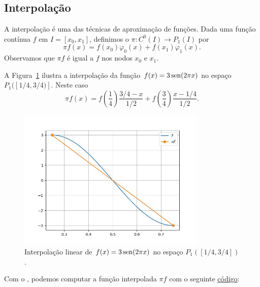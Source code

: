 \subsection{Interpolação}

A interpolação é uma das técnicas de aproximação de funções. Dada uma função contínua $f$ em $I=[x_0, x_1]$, definimos o  $\pi: C^0(I)\to P_1(I)$ por
\begin{equation}
  \pi f (x) = f(x_0)\varphi_0(x) + f(x_1)\varphi_1(x).
\end{equation}
Observamos que $\pi f$ é igual a $f$ nos nodos $x_0$ e $x_1$. 

\begin{ex}\label{ex:interp_lin}
  A Figura~\ref{fig:ex_interp_lin} ilustra a interpolação da função $f(x)=3\operatorname{sen}(2\pi x)$ no espaço $P_1([1/4, 3/4)]$. Neste caso
  \begin{equation}
    \pi f(x) = f\left(\frac{1}{4}\right)\frac{3/4-x}{1/2} + f\left(\frac{3}{4}\right)\frac{x-1/4}{1/2}.
  \end{equation}

  \begin{figure}[h!]
    \centering
    \includegraphics[width=0.8\textwidth]{./cap_mef1d/dados/ex_interp_lin/ex_interp_lin}
    \caption{Interpolação linear de $f(x)=3\operatorname{sen}(2\pi x)$ no espaço $P_1([1/4, 3/4])$.}
    \label{fig:ex_interp_lin}
  \end{figure}

\ifispython
Com o \fenics, podemos computar a função interpolada $\pi f$ com o seguinte \href{https://github.com/phkonzen/notas/blob/master/src/MetodoElementosFinitos/cap_mef1d/dados/ex_interp_lin/ex_interp_lin.py}{código}:

\fi
\end{ex}

